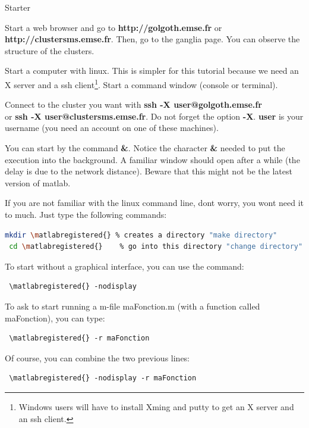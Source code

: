 \documentclass{emse-exo}
\begin{document}
 \begin{question}{Starter}
  \item Start a web browser and go to \textbf{http://golgoth.emse.fr} or \textbf{http://clustersms.emse.fr}. Then, go to the ganglia page. You can observe the structure of the clusters.
  \item Start a computer with linux. This is simpler for this tutorial because we need an X server and a ssh client\footnote{Windows users will have to install Xming and putty to get an X server and an ssh client.}. Start a command window (console or terminal).
  \item Connect to the cluster you want with \textbf{ssh -X user@golgoth.emse.fr} \\
or \textbf{ssh -X user@clustersms.emse.fr}. Do not forget the option \textbf{-X}. \textbf{user} is your username (you need an account on one of these machines).

  \item You can start \matlabregistered{} by the command \textbf{\matlabregistered{} \&}. Notice the character \textbf{\&} needed to put the execution into the background. A familiar window should open after a while (the delay is due to the network distance). Beware that this might not be the latest version of matlab.
  \item If you are not familiar with the linux command line, dont worry, you wont need it to much. Just type the following commands:
\begin{lstlisting}[language=sh]
 mkdir \matlabregistered{} % creates a directory "make directory"
 cd \matlabregistered{}    % go into this directory "change directory"
\end{lstlisting}

\item To start \matlabregistered{} without a graphical interface, you can use the command:
\begin{lstlisting}
 \matlabregistered{} -nodisplay
\end{lstlisting}

\item To ask \matlabregistered{} to start running a m-file maFonction.m (with a function called maFonction), you can type:
\begin{lstlisting}
 \matlabregistered{} -r maFonction
\end{lstlisting}

\item Of course, you can combine the two previous lines:
\begin{lstlisting}
 \matlabregistered{} -nodisplay -r maFonction
\end{lstlisting}



\end{question}
\end{document}
